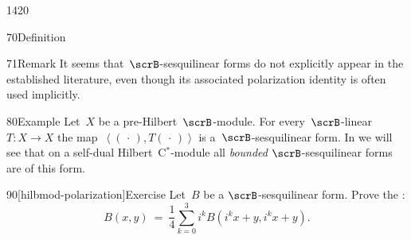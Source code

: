 \begin{parsec}{1420}
\begin{point}{70}{Definition}
\begin{point}{71}{Remark}
It seems that~$\scrB$-sesquilinear forms do not explicitly appear
    in the established literature,
    even though its associated polarization identity
    is often used implicitly.
\end{point}
\end{point}
\begin{point}{80}{Example}%
Let~$X$ be a pre-Hilbert~$\scrB$-module.
For every~$\scrB$-linear~$T\colon X \to X$
    the map~$\left<(\,\cdot\,), T (\,\cdot\,)\right>$
    is a~$\scrB$-sesquilinear form.
In 
    we will see that on a self-dual Hilbert~C$^*$-module
    all \emph{bounded}
    $\scrB$-sesquilinear forms
    are of this form.
\end{point}
\begin{point}{90}[hilbmod-polarization]{Exercise}%
Let~$B$ be a $\scrB$-sesquilinear form.
Prove the :
\begin{equation*}
    B(x,y) \ =\  \frac{1}{4} \sum_{k=0}^3 i^k B(i^k x + y, i^k x + y).
\end{equation*}
\end{point}
\spacingfix{}
\end{parsec}

